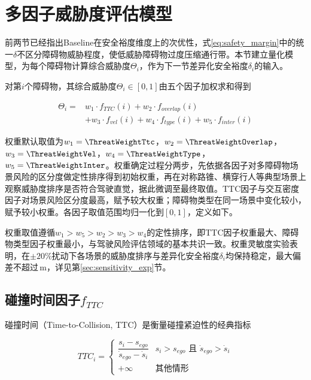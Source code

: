 \section{多因子威胁度评估模型}
前两节已经指出Baseline在安全裕度维度上的次优性，式\eqref{eq:safety_margin}中的统一$\delta$不区分障碍物威胁程度，使低威胁障碍物过度压缩通行带。本节建立量化模型，为每个障碍物计算综合威胁度$\Theta_i$，作为下一节差异化安全裕度$\delta_i$的输入。

对第$i$个障碍物，其综合威胁度$\Theta_i \in [0, 1]$由五个因子加权求和得到

\begin{equation}
\begin{split}
    \Theta_i = {} & w_1 \cdot f_{TTC}(i) + w_2 \cdot f_{overlap}(i) \\
                  & + w_3 \cdot f_{vel}(i) + w_4 \cdot f_{type}(i) + w_5 \cdot f_{inter}(i)
\end{split}
    \label{eq:threat_score}
\end{equation}

权重默认取值为$w_1 = \ThreatWeightTtc$，$w_2 = \ThreatWeightOverlap$，$w_3 = \ThreatWeightVel$，$w_4 = \ThreatWeightType$，$w_5 = \ThreatWeightInter$。权重确定过程分两步，先依据各因子对多障碍物场景风险的区分度做定性排序得到初始权重，再在对称路锥、横穿行人等典型场景上观察威胁度排序是否符合驾驶直觉，据此微调至最终取值。TTC因子与交互密度因子对场景风险区分度最高，赋予较大权重；障碍物类型在同一场景中变化较小，赋予较小权重。各因子取值范围均归一化到$[0, 1]$，定义如下。

权重取值遵循$w_1 > w_5 > w_2 > w_3 > w_4$的定性排序，即TTC因子权重最大、障碍物类型因子权重最小，与驾驶风险评估领域的基本共识一致。权重灵敏度实验表明，在$\pm20\%$扰动下各场景的威胁度排序与差异化安全裕度$\delta_i$均保持稳定，最大偏差不超过\SensWorstAbsDev{}\,m，详见第\ref{sec:sensitivity_exp}节。

\subsection{碰撞时间因子$f_{TTC}$}
碰撞时间（Time-to-Collision, TTC）是衡量碰撞紧迫性的经典指标

\begin{equation}
    TTC_i = \begin{cases}
        \dfrac{s_i - s_{ego}}{\dot{s}_{ego} - \dot{s}_i} & s_i > s_{ego} \text{ 且 } \dot{s}_{ego} > \dot{s}_i \\[0.6em]
        +\infty & \text{其他情形}
    \end{cases}
    \label{eq:ttc}
\end{equation}

